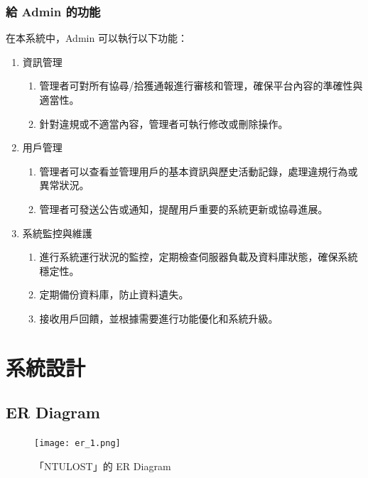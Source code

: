\documentclass[12pt,a4paper]{article}
\begin{document}
   
\subsubsection{給 Admin 的功能}

在本系統中，Admin 可以執行以下功能：
\begin{enumerate}
\item 

資訊管理
\begin{enumerate}
    \item 管理者可對所有協尋/拾獲通報進行審核和管理，確保平台內容的準確性與適當性。
    \item 針對違規或不適當內容，管理者可執行修改或刪除操作。
\end{enumerate}

\item 

用戶管理
\begin{enumerate}
    \item 管理者可以查看並管理用戶的基本資訊與歷史活動記錄，處理違規行為或異常狀況。
    \item 管理者可發送公告或通知，提醒用戶重要的系統更新或協尋進展。
\end{enumerate}

\item 

系統監控與維護
\begin{enumerate}
    \item 進行系統運行狀況的監控，定期檢查伺服器負載及資料庫狀態，確保系統穩定性。
    \item 定期備份資料庫，防止資料遺失。
    \item 接收用戶回饋，並根據需要進行功能優化和系統升級。
\end{enumerate}


\end{enumerate}


\section{系統設計}

\subsection{ER Diagram}

\vspace*{1cm}
\begin{figure}[hbt]
    \hspace*{-2.5cm}\texttt{[image: er\_1.png]}
    \caption{「NTULOST」的 ER Diagram}
    \label{fig:erDiagram}
\end{figure}
\end{document}
